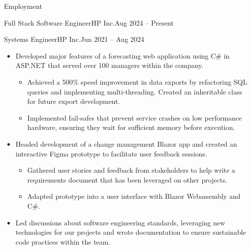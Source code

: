\documentclass[]{mcdowellcv}
\begin{document}
\begin{cvsection}{Employment}
\begin{cvsubsection}{Full Stack Software Engineer}{HP Inc.}{Aug 2024 -- Present}
	   \end{cvsubsection}
    \vspace{-6pt}
     \begin{cvsubsection}{Systems Engineer}{HP Inc.}{Jun 2021 -- Aug 2024}
            \vspace{-4pt}
          \begin{itemize}%
              \item Developed major features of a forecasting web application using C\# in ASP.NET that served over 100 managers within the company.
                \begin{itemize}%
                    \item Achieved a 500\% speed improvement in data exports by refactoring SQL queries and implementing multi-threading. Created an inheritable class for future export development.
                    \item Implemented fail-safes that prevent service crashes on low performance hardware, ensuring they wait for sufficient memory before execution.      
                \end{itemize} 
            \end{itemize}
            \begin{itemize}%
            \item Headed development of a change management Blazor app and created an interactive Figma prototype to facilitate user feedback sessions.
                \begin{itemize}%
                    \item Gathered user stories and feedback from stakeholders to help write a requirements document that has been leveraged on other projects.
                    \item Adapted prototype into a user interface with Blazor Webassembly and C\#.
                \end{itemize} 
            \item Led discussions about software engineering standards, leveraging new technologies for our projects and wrote documentation to ensure sustainable code practices within the team.
            \end{itemize}    
    \end{cvsubsection}
        \end{cvsection}
        \vspace{-4pt}
\end{document}

